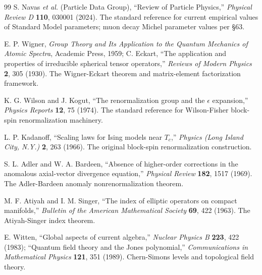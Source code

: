 \documentclass[11pt,letterpaper]{article}
\begin{document}
\begin{thebibliography}{99}
S. Navas \emph{et al.} (Particle Data Group), ``Review of Particle Physics,'' \emph{Physical Review D} \textbf{110}, 030001 (2024). The standard reference for current empirical values of Standard Model parameters; muon decay Michel parameter values per §63.

E. P. Wigner, \emph{Group Theory and Its Application to the Quantum Mechanics of Atomic Spectra}, Academic Press, 1959; C. Eckart, ``The application and properties of irreducible spherical tensor operators,'' \emph{Reviews of Modern Physics} \textbf{2}, 305 (1930). The Wigner-Eckart theorem and matrix-element factorization framework.

K. G. Wilson and J. Kogut, ``The renormalization group and the $\epsilon$ expansion,'' \emph{Physics Reports} \textbf{12}, 75 (1974). The standard reference for Wilson-Fisher block-spin renormalization machinery.

L. P. Kadanoff, ``Scaling laws for Ising models near $T_c$,'' \emph{Physics (Long Island City, N.Y.)} \textbf{2}, 263 (1966). The original block-spin renormalization construction.

S. L. Adler and W. A. Bardeen, ``Absence of higher-order corrections in the anomalous axial-vector divergence equation,'' \emph{Physical Review} \textbf{182}, 1517 (1969). The Adler-Bardeen anomaly nonrenormalization theorem.

M. F. Atiyah and I. M. Singer, ``The index of elliptic operators on compact manifolds,'' \emph{Bulletin of the American Mathematical Society} \textbf{69}, 422 (1963). The Atiyah-Singer index theorem.

E. Witten, ``Global aspects of current algebra,'' \emph{Nuclear Physics B} \textbf{223}, 422 (1983); ``Quantum field theory and the Jones polynomial,'' \emph{Communications in Mathematical Physics} \textbf{121}, 351 (1989). Chern-Simons levels and topological field theory.

\end{thebibliography}

\end{document}

